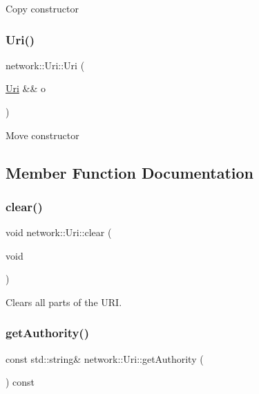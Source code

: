 Copy constructor \mbox{\label{classnetwork_1_1Uri_a8f0a8044622be7de3a491f57c1c64aba}} 
\subsubsection{\texorpdfstring{Uri()}{Uri()}\hspace{0.1cm}{\footnotesize\ttfamily [3/3]}}
{\footnotesize\ttfamily network\+::\+Uri\+::\+Uri (\begin{DoxyParamCaption}\item[{\hyperlink{classnetwork_1_1Uri}{Uri} \&\&}]{o }\end{DoxyParamCaption})}

Move constructor 

\subsection{Member Function Documentation}
\mbox{\label{classnetwork_1_1Uri_a533aa1434d65a153f23a69da5eb2c8d2}} 
\subsubsection{\texorpdfstring{clear()}{clear()}}
{\footnotesize\ttfamily void network\+::\+Uri\+::clear (\begin{DoxyParamCaption}\item[{void}]{ }\end{DoxyParamCaption})}

Clears all parts of the U\+RI. \mbox{\label{classnetwork_1_1Uri_a1e1dc24899d904d933305b664efff40b}} 
\subsubsection{\texorpdfstring{get\+Authority()}{getAuthority()}}
{\footnotesize\ttfamily const std\+::string\& network\+::\+Uri\+::get\+Authority (\begin{DoxyParamCaption}{ }\end{DoxyParamCaption}) const\hspace{0.3cm}{\ttfamily [inline]}}

